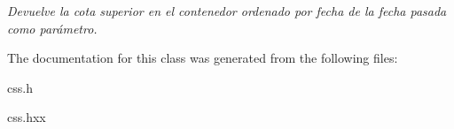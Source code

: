 \begin{DoxyCompactItemize}
\begin{DoxyCompactList}\small\item\em Devuelve la cota superior en el contenedor ordenado por fecha de la fecha pasada como parámetro. \end{DoxyCompactList}\end{DoxyCompactItemize}


The documentation for this class was generated from the following files\+:\begin{DoxyCompactItemize}
\item 
css.\+h\item 
css.\+hxx\end{DoxyCompactItemize}
